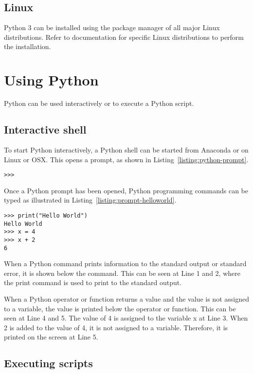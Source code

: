 \documentclass[11pt,a4paper]{article}
\begin{document}
\subsection{Linux}
Python 3 can be installed using the package manager of all major Linux distributions.  Refer to documentation for specific Linux distributions to perform the installation.

\section{Using Python}
Python can be used interactively or to execute a Python script.

\subsection{Interactive shell}
To start Python interactively, a Python shell can be started from Anaconda or on Linux or OSX.  This opens a prompt, as shown in Listing~\ref{listing:python-prompt}.

\begin{lstlisting}[caption={The Python prompt.},label=listing:python-prompt]
>>>
\end{lstlisting}

Once a Python prompt has been opened, Python programming commands can be typed as illustrated in Listing~\ref{listing:prompt-helloworld}.

\begin{lstlisting}[caption={Using the Python prompt.},label=listing:prompt-helloworld]
>>> print("Hello World")
Hello World
>>> x = 4
>>> x + 2
6
\end{lstlisting}

When a Python command prints information to the standard output or standard error, it is shown below the command.  This can be seen at Line 1 and 2, where the print command is used to print to the standard output.

When a Python operator or function returns a value and the value is not assigned to a variable, the value is printed below the operator or function.  This can be seen at Line 4 and 5.  The value of 4 is assigned to the variable x at Line 3.  When 2 is added to the value of 4, it is not assigned to a variable.  Therefore, it is printed on the screen at Line 5.

\subsection{Executing scripts}
\end{document}
